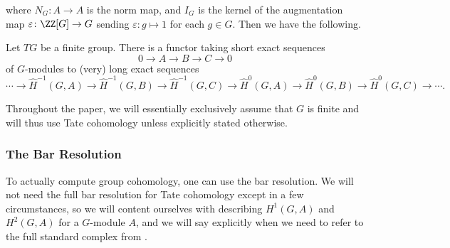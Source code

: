 where $N_G\colon A\to A$ is the norm map, and $I_G$ is the kernel of the augmentation map $\varepsilon\colon\ZZ[G]\to G$ sending $\varepsilon\colon g\mapsto1$ for each $g\in G$. Then we have the following.
\begin{theorem}
	Let $TG$ be a finite group. There is a functor taking short exact sequences
	\[0\to A\to B\to C\to 0\]
	of $G$-modules to (very) long exact sequences
	\[\cdots\to\widehat H^{-1}(G,A)\to\widehat H^{-1}(G,B)\to\widehat H^{-1}(G,C)\to\widehat H^0(G,A)\to\widehat H^0(G,B)\to\widehat H^0(G,C)\to\cdots.\]
\end{theorem}
Throughout the paper, we will essentially exclusively assume that $G$ is finite and will thus use Tate cohomology unless explicitly stated otherwise.

\subsubsection{The Bar Resolution} \label{sec:barres}
To actually compute group cohomology, one can use the bar resolution. We will not need the full bar resolution for Tate cohomology except in a few circumstances, so we will content ourselves with describing $H^1(G,A)$ and $H^2(G,A)$ for a $G$-module $A$, and we will say explicitly when we need to refer to the full standard complex from \cite{atiyah-wall}.

